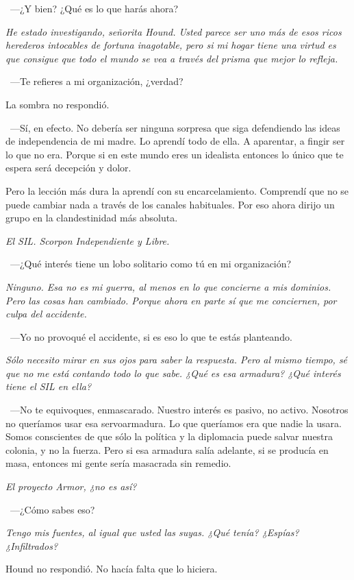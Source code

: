 ~---¿Y bien? ¿Qué es lo que harás ahora?

\emph{He estado investigando, señorita Hound. Usted parece ser uno más de esos ricos herederos intocables de fortuna inagotable, pero si mi hogar tiene una virtud es que consigue que todo el mundo se vea a través del prisma que mejor lo refleja.}

~---Te refieres a mi organización, ¿verdad?

La sombra no respondió.

~---Sí, en efecto. No debería ser ninguna sorpresa que siga defendiendo las ideas de independencia de mi madre. Lo aprendí todo de ella. A aparentar, a fingir ser lo que no era. Porque si en este mundo eres un idealista entonces lo único que te espera será decepción y dolor.

\rquoti Pero la lección más dura la aprendí con su encarcelamiento. Comprendí que no se puede cambiar nada a través de los canales habituales. Por eso ahora dirijo un grupo en la clandestinidad más absoluta.

\emph{El SIL. Scorpon Independiente y Libre.}

~---¿Qué interés tiene un lobo solitario como tú en mi organización?

\emph{Ninguno. Esa no es mi guerra, al menos en lo que concierne a mis dominios. Pero las cosas han cambiado. Porque ahora en parte sí que me conciernen, por culpa del accidente.}

~---Yo no provoqué el accidente, si es eso lo que te estás planteando.

\emph{Sólo necesito mirar en sus ojos para saber la respuesta. Pero al mismo tiempo, sé que no me está contando todo lo que sabe. ¿Qué es esa armadura? ¿Qué interés tiene el SIL en ella?}

~---No te equivoques, enmascarado. Nuestro interés es pasivo, no activo. Nosotros no queríamos usar esa servoarmadura. Lo que queríamos era que nadie la usara. Somos conscientes de que sólo la política y la diplomacia puede salvar nuestra colonia, y no la fuerza. Pero si esa armadura salía adelante, si se producía en masa, entonces mi gente sería masacrada sin remedio.

\emph{El proyecto Armor, ¿no es así?}

~---¿Cómo sabes eso?

\emph{Tengo mis fuentes, al igual que usted las suyas. ¿Qué tenía? ¿Espías? ¿Infiltrados?}

Hound no respondió. No hacía falta que lo hiciera.


